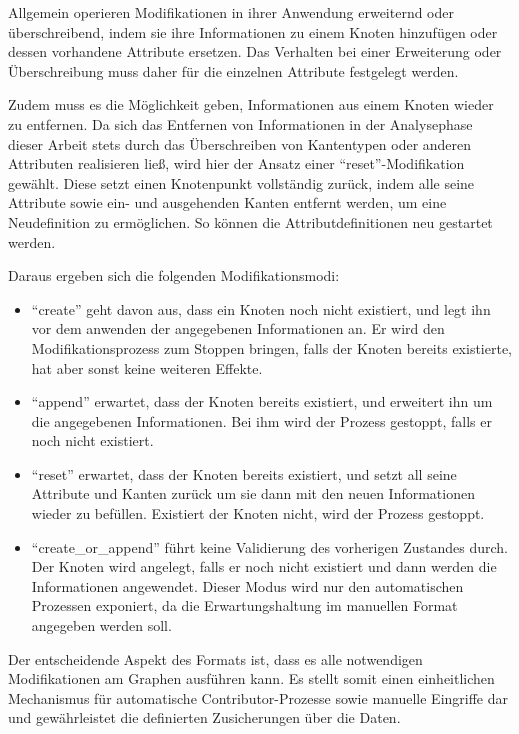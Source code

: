 Allgemein operieren Modifikationen in ihrer Anwendung erweiternd oder überschreibend, indem sie ihre Informationen zu einem Knoten hinzufügen oder dessen vorhandene Attribute ersetzen.
Das Verhalten bei einer Erweiterung oder Überschreibung muss daher für die einzelnen Attribute festgelegt werden.

Zudem muss es die Möglichkeit geben, Informationen aus einem Knoten wieder zu entfernen.
Da sich das Entfernen von Informationen in der Analysephase dieser Arbeit stets durch das Überschreiben von Kantentypen oder anderen Attributen realisieren ließ, wird hier der Ansatz einer \enquote{reset}-Modifikation gewählt.
Diese setzt einen Knotenpunkt vollständig zurück, indem alle seine Attribute sowie ein- und ausgehenden Kanten entfernt werden, um eine Neudefinition zu ermöglichen.
So können die Attributdefinitionen neu gestartet werden.

Daraus ergeben sich die folgenden Modifikationsmodi:

\begin{itemize}
    \itemsep0em
    \item \enquote{create} geht davon aus, dass ein Knoten noch nicht existiert, und legt ihn vor dem anwenden der angegebenen Informationen an.
    Er wird den Modifikationsprozess zum Stoppen bringen, falls der Knoten bereits existierte, hat aber sonst keine weiteren Effekte.
    \item \enquote{append} erwartet, dass der Knoten bereits existiert, und erweitert ihn um die angegebenen Informationen.
    Bei ihm wird der Prozess gestoppt, falls er noch nicht existiert.
    \item \enquote{reset} erwartet, dass der Knoten bereits existiert, und setzt all seine Attribute und Kanten zurück um sie dann mit den neuen Informationen wieder zu befüllen.
    Existiert der Knoten nicht, wird der Prozess gestoppt.
    \item \enquote{create\_or\_append} führt keine Validierung des vorherigen Zustandes durch.
    Der Knoten wird angelegt, falls er noch nicht existiert und dann werden die Informationen angewendet.
    Dieser Modus wird nur den automatischen Prozessen exponiert, da die Erwartungshaltung im manuellen Format angegeben werden soll.
\end{itemize}

Der entscheidende Aspekt des Formats ist, dass es alle notwendigen Modifikationen am Graphen ausführen kann.
Es stellt somit einen einheitlichen Mechanismus für automatische Contributor-Prozesse sowie manuelle Eingriffe dar und gewährleistet die definierten Zusicherungen über die Daten.

